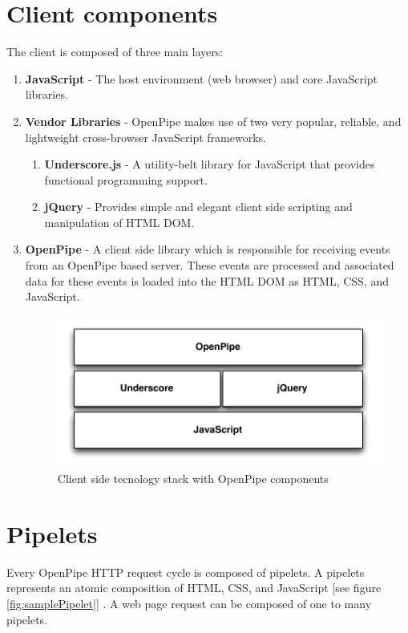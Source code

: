 \documentclass[12pt]{report}
\begin{document}
\section{Client components}
The client is composed of three main layers:

\begin{enumerate}
	\item \textbf{JavaScript} - The host environment (web browser) and core JavaScript libraries.
	\item \textbf{Vendor Libraries} - OpenPipe makes use of two very popular, reliable, and lightweight cross-browser JavaScript frameworks.
		\begin{enumerate} 
			\item \textbf{Underscore.js} - A utility-belt library for JavaScript that provides functional programming support.
			\item \textbf{jQuery} - Provides simple and elegant client side scripting and manipulation of HTML DOM.
		\end{enumerate}
	\item \textbf{OpenPipe} - A client side library which is responsible for receiving events from an OpenPipe based server. These events are processed and associated data for these events is loaded into the HTML DOM as HTML, CSS, and JavaScript.
		
		\begin{figure}[H]
		\label{fig:clientFrameworkStack}
		\centering
		\includegraphics[width=\textwidth,keepaspectratio]{figures/images/client_stack.pdf}
		\caption{Client side tecnology stack with OpenPipe components}
		\end{figure}

\end{enumerate}


\section{Pipelets}
Every OpenPipe HTTP request cycle is composed of pipelets. A pipelets represents an atomic composition of HTML, CSS, and JavaScript [see figure \ref{fig:samplePipelet}] . A web page request can be composed of one to many pipelets.
\end{document}
